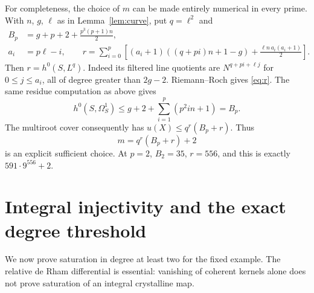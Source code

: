 \documentclass[11pt,a4paper]{article}
\theoremstyle{definition}\newtheorem{definition}[theorem]{Definition}
\theoremstyle{remark}\newtheorem{remark}[theorem]{Remark}
\numberwithin{equation}{section}
\begin{document}
For completeness, the choice of $m$ can be made entirely numerical in every prime. With $n$, $g$, $\ell$ as in Lemma~\ref{lem:curve}, put $q=\ell^2$ and
\begin{align}
 B_p&=g+p+2+\frac{p^3(p+1)n}{2},\label{eq:Bp}\\
 a_i&=p\ell-i,\qquad
 r=\sum_{i=0}^{p}\left[(a_i+1)((q+pi)n+1-g)
                  +\frac{\ell n\,a_i(a_i+1)}2\right].\label{eq:r}
\end{align}
Then $r=h^0(S,L^q)$. Indeed its filtered line quotients are $N^{q+pi+\ell j}$ for $0\le j\le a_i$, all of degree greater than $2g-2$. Riemann--Roch gives \eqref{eq:r}. The same residue computation as above gives
\[
 h^0(S,\Omega_S^1)\le g+2+\sum_{i=1}^{p}(p^2in+1)=B_p.
\]
The multiroot cover consequently has $u(X)\le q^r(B_p+r)$. Thus
\[
 m=q^r(B_p+r)+2
\]
is an explicit sufficient choice. At $p=2$, $B_2=35$, $r=556$, and this is exactly $591\cdot9^{556}+2$.

\section{Integral injectivity and the exact degree threshold}\label{sec:degrees}

We now prove saturation in degree at least two for the fixed example. The relative de Rham differential is essential: vanishing of coherent kernels alone does not prove saturation of an integral crystalline map.
\end{document}
